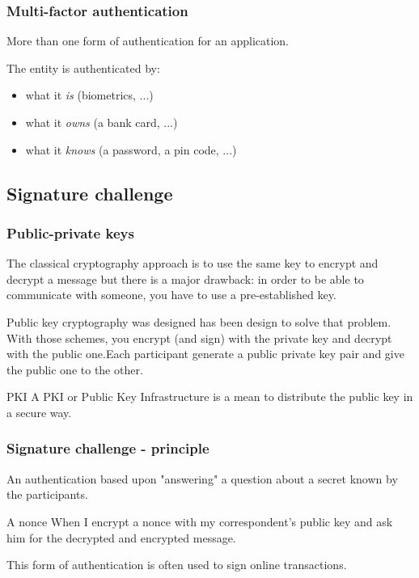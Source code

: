\begin{frame}
\frametitle{Multi-factor authentication}
\begin{center}
More than one form of authentication for an application.
\end{center}
The entity is authenticated by:
\begin{itemize}
\item what it \emph{is} (biometrics, ...)
\item what it \emph{owns} (a bank card, ...)
\item what it \emph{knows} (a password, a pin code, ...)
\end{itemize}
\end{frame}

\subsection{Signature challenge}

\begin{frame}
\frametitle{Public-private keys}
The classical cryptography approach is to use the same key to encrypt
and decrypt a message but there is a major drawback: in order to be
able to communicate with someone, you have to use a pre-established
key.

Public key cryptography was designed has been design to solve that
problem. With those schemes, you encrypt (and sign) with the private
key and decrypt with the public one.Each participant generate a public
private key pair and give the public one to the other.
\begin{block}{PKI}
A PKI or Public Key Infrastructure is a mean to distribute the public
key in a secure way.
\end{block}
\end{frame}

\begin{frame}
\frametitle{Signature challenge - principle}
An authentication based upon "answering" a question about a secret
known by the participants.
\begin{exampleblock}{A nonce}
When I encrypt a nonce with my correspondent's public key and ask him for the
decrypted and encrypted message.
\end{exampleblock}
This form of authentication is often used to sign online transactions.
\end{frame}

